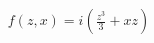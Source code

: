 \documentclass[preview]{standalone}
\begin{document}
\begin{align*}
f(z,x) = i(\frac{z^3}{3}+xz)
\end{align*}
\end{document}
